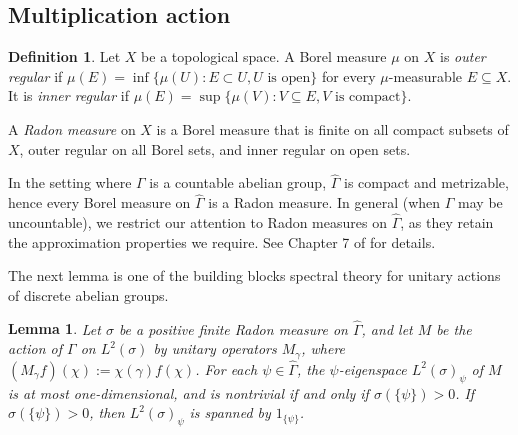 \documentclass[12pt]{amsart} \usepackage{amsmath,centernot,amssymb,leftindex}
\newtheorem{lemma}[theorem]{Lemma}
\numberwithin{theorem}{section}
\numberwithin{equation}{section}
\theoremstyle{definition}
\newtheorem{definition}[theorem]{Definition}
\begin{document}
\subsection{Multiplication action}  
\begin{definition} Let $X$ be a topological space. A Borel measure $\mu$ on $X$ is \emph{outer regular} if $\mu(E)=\inf\{\mu(U):E\subset U, U \text{ is open}\}$ for every $\mu$-measurable $E\subseteq X$.  It is \emph{inner regular} if $\mu(E)=\sup \{\mu(V):V\subseteq E, V\text{ is compact}\}$.
	
	A \emph{Radon measure} on $X$ is a Borel measure that is finite on all compact subsets of $X$, outer regular on all Borel sets, and inner regular on open sets.
\end{definition}
In the setting where $\Gamma$ is a countable abelian group, $\widehat{\Gamma}$ is compact and metrizable, hence every Borel measure on $\widehat{\Gamma}$ is a Radon measure.  In general (when $\Gamma$ may be uncountable), we restrict our attention to Radon measures on $\widehat{\Gamma}$, as they retain the approximation properties we require.  See Chapter 7 of \cite{Folland_RealAnalysis} for details.



The next lemma is one of the building blocks spectral theory for unitary actions of discrete abelian groups.  





\begin{lemma}\label{lem:Meigenspaces}  Let $\sigma$ be a positive finite Radon measure on $\widehat{\Gamma}$, and let $M$ be the action of $\Gamma$ on $L^{2}(\sigma)$ by unitary operators $M_{\gamma}$, where $(M_{\gamma} f)(\chi):=\chi(\gamma)f(\chi)$.  For each $\psi\in \widehat{\Gamma}$, the $\psi$-eigenspace $L^{2}(\sigma)_{\psi}$ of $M$ is at most one-dimensional, and is nontrivial if and only if $\sigma(\{\psi\})>0$.  If $\sigma(\{\psi\})>0$, then $L^{2}(\sigma)_{\psi}$ is spanned by $1_{\{\psi\}}$.
\end{lemma}
\end{document}
